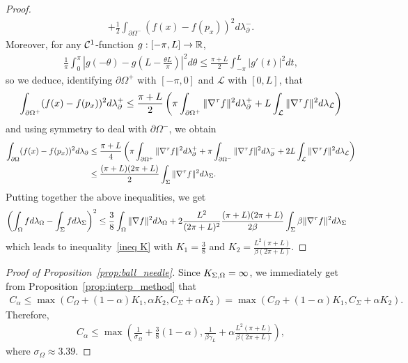 \documentclass[a4paper]{article}
\theoremstyle{definition}
\numberwithin{equation}{section}
\begin{document}
\begin{proof}
\begin{align*}
 +\frac{1}{2} \int_{\partial \Omega^-} (f(x)-f(p_x))^2 d \lambda^-_\partial .
\end{align*}
Moreover, for  
any $\mathcal{C}^1$-function $g:[-\pi, L] \to \mathbb{R}$, 
\begin{align*}
\frac{1}{\pi} \int_0^\pi \left|g(-\theta)-g(L-\textstyle \frac{\theta L}{\pi})\right|^2 d\theta 
\leq \frac{\pi+L}{2} \int_{-\pi}^L |g'(t)|^2  dt ,
\end{align*}
so we deduce, identifying $\partial \Omega^+$ with $[-\pi,0]$ and $\mathcal L$ with $[0,L]$, that
\begin{align*}
\int_{\partial \Omega^+} (f(x)-f(p_x))^2 d \lambda^+_\partial 
\leq \frac{\pi+L}{2} \left( \pi \int_ {\partial \Omega^+} \|\nabla^\tau f\|^2 d \lambda^+_\partial  + L \int_\mathcal L  \|\nabla^\tau f\|^2 d \lambda_\mathcal L \right)
\end{align*}
and using symmetry to deal with $\partial \Omega^-$, we obtain
\begin{align*}
 \int_{\partial \Omega} (f(x)-f(p_x))^2 d \lambda_\partial 
 &\leq \frac{\pi+L}{4}\left( \pi \int_ {\partial \Omega^+} \|\nabla^\tau f\|^2 d \lambda^+_\partial +\pi \int_ {\partial \Omega^-} \|\nabla^\tau f\|^2 d \lambda^-_\partial  + 2L \int_\mathcal L  \|\nabla^\tau f\|^2 d \lambda_\mathcal L \right) \\
  &\leq \frac{(\pi+L)(2\pi+L)	}{2} \int_\Sigma \|\nabla^\tau f\|^2 d \lambda_\Sigma.
\end{align*}
Putting together the above inequalities, we get
\begin{align*}
\left( \int_\Omega f d \lambda_\Omega - \int_\Sigma f d \lambda_\Sigma \right)^2
&\leq \frac{3}{8} \int_\Omega \| \nabla f \|^2 d\lambda_\Omega
+ 2\frac{L^2}{(2\pi +L)^2} \frac{(\pi+L)(2\pi+L)	}{2\beta} \int_\Sigma \beta\|\nabla^\tau f\|^2 d \lambda_\Sigma 
\end{align*}
which leads to inequality~\eqref{ineq K} with $K_1=\frac{3}{8}$ and $K_2=\frac{L^2(\pi+L)}{\beta(2\pi + L)}$. 
\end{proof}

\begin{proof}[Proof of Proposition~\ref{prop:ball_needle}]
Since $K_{\Sigma,\Omega}=\infty$, we immediately get from Proposition~\ref{prop:interp_method} that 
\begin{align*}
C_\alpha \leq
\max \left(
C_\Omega + (1-\alpha)K_1 ,
\alpha K_2 ,
C_\Sigma + \alpha K_2 \right)
= \max \left(
C_\Omega + (1-\alpha)K_1 ,
C_\Sigma + \alpha K_2 \right).
\end{align*}
Therefore,  
\begin{align}
\label{needle_with_beta}
    C_\alpha \leq \max \left( \frac{1}{\sigma_{\Omega}} + \frac{3}{8}(1-\alpha), \frac{1}{\beta\gamma_L} + \alpha \frac{L^2(\pi+L)}{\beta(2\pi + L)} \right),
\end{align}
where $\sigma_{\Omega} \approx 3.39$. 
\end{proof}
\end{document}
